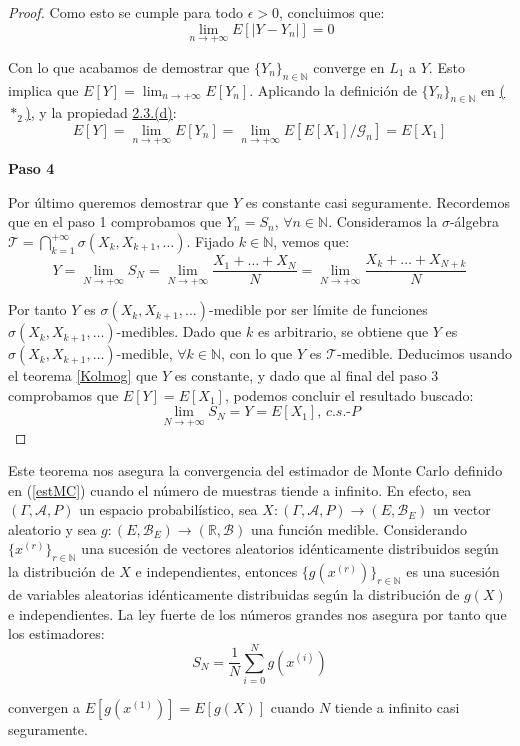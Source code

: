 \begin{proof}
Como esto se cumple para todo $\epsilon>0$, concluimos que:
$$\lim_{n\to +\infty}E[|Y-Y_n|] = 0 $$

Con lo que acabamos de demostrar que $\{Y_n\}_{n\in\mathds{N}}$ converge en $L_1$ a $Y$. Esto implica que $E[Y] = \lim_{n\to +\infty}E[Y_n]$. Aplicando la definición de $\{Y_n\}_{n\in\mathds{N}}$ en \hyperref[aux2]{($*_2$)}, y la propiedad \hyperref[PropE6]{2.3.(d)}:
$$E[Y] = \lim_{n\to +\infty}E[Y_n] = \lim_{n\to +\infty}E[E[X_1]/\mathcal{G}_n] = E[X_1] $$

\textbf{Paso 4}

Por último queremos demostrar que $Y$ es constante casi seguramente. Recordemos que en el paso 1 comprobamos que $Y_n = S_n$, $\forall n\in\mathds{N}$. Consideramos la $\sigma$-álgebra $\mathscr{T} = \bigcap_{k=1}^{+\infty}\sigma(X_k,X_{k+1},\ldots)$. Fijado $k\in\mathds{N}$, vemos que:
$$Y=\lim_{N\to +\infty}S_N = \lim_{N\to +\infty} \frac{X_1+\ldots +X_N}{N} = \lim_{N\to +\infty} \frac{X_{k}+\ldots +X_{N+k}}{N}$$

Por tanto $Y$ es $\sigma(X_k,X_{k+1},\ldots )$-medible por ser límite de funciones $\sigma(X_k,X_{k+1},\ldots )$-medibles. Dado que $k$ es arbitrario, se obtiene que $Y$ es $\sigma(X_k,X_{k+1},\ldots )$-medible, $\forall k \in \mathds{N}$, con lo que $Y$ es $\mathscr{T}$-medible. Deducimos usando el teorema \ref{Kolmog} que $Y$ es constante, y dado que al final del paso 3 comprobamos que $E[Y] = E[X_1]$, podemos concluir el resultado buscado:
$$\lim_{N\to +\infty}S_N = Y = E[X_1] \text{, } c.s.\text{-}P$$
\end{proof}
Este teorema nos asegura la convergencia del estimador de Monte Carlo definido en (\ref{estMC}) cuando el número de muestras tiende a infinito. En efecto, sea $(\Gamma , \mathcal{A}, P)$ un espacio probabilístico, sea $X:(\Gamma , \mathcal{A}, P)\rightarrow (E,\mathscr{B}_E)$ un vector aleatorio y sea $g:(E,\mathscr{B}_E)\rightarrow (\mathds{R},\mathscr{B})$ una función medible. Considerando $\{x^{(r)}\}_{r\in\mathds{N}}$ una sucesión de vectores aleatorios idénticamente distribuidos según la distribución de $X$ e independientes, entonces $\{g(x^{(r)})\}_{r\in\mathds{N}}$ es una sucesión de variables aleatorias idénticamente distribuidas según la distribución de $g(X)$ e independientes. La ley fuerte de los números grandes nos asegura por tanto que los estimadores:
$$S_N = \frac{1}{N}\sum_{i=0}^N g(x^{(i)}) $$

convergen a $E[g(x^{(1)})] = E[g(X)]$ cuando $N$ tiende a infinito casi seguramente.

